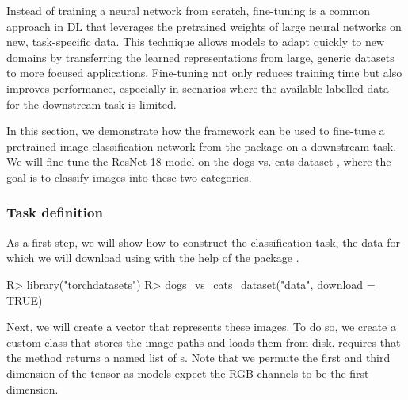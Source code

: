 \documentclass[article]{jss}
\theoremstyle{definition}
\begin{document}
Instead of training a neural network from scratch, fine-tuning is a common approach in DL that leverages the pretrained weights of large neural networks on new, task-specific data.
This technique allows models to adapt quickly to new domains by transferring the learned representations from large, generic datasets to more focused applications.
Fine-tuning not only reduces training time but also improves performance, especially in scenarios where the available labelled data for the downstream task is limited.

In this section, we demonstrate how the  framework can be used to fine-tune a pretrained image classification network from the  package on a downstream task.
We will fine-tune the ResNet-18 model \citep{ref-he2015deepresiduallearningimage} on the dogs vs. cats dataset \citep{ref-dogs-vs-cats2013}, where the goal is to classify images into these two categories.

\subsubsection{Task definition}

As a first step, we will show how to construct the classification task, the data for which we will download using with the help of the  \rlang{} package \citep{torchdatasets}.

\begin{CodeInput}
R> library("torchdatasets")
R> dogs_vs_cats_dataset("data", download = TRUE)
\end{CodeInput}

Next, we will create a  vector that represents these images.
To do so, we create a custom  class that stores the image paths and loads them from disk.
 requires that the  method returns a named list of s.
Note that we permute the first and third dimension of the tensor as  models expect the RGB channels to be the first dimension.

\end{document}

